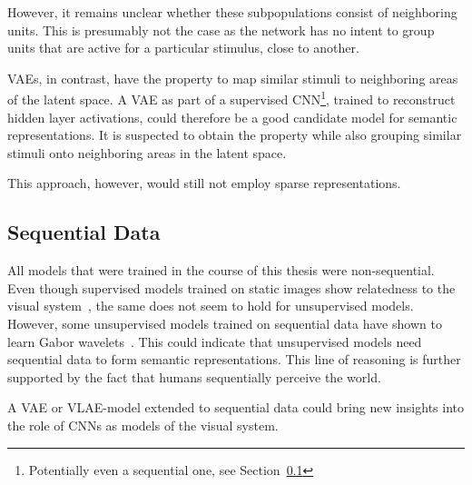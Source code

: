 However, it remains unclear whether these subpopulations consist of neighboring units.
This is presumably not the case as the network has no intent to group units that are active for a particular stimulus, close to another.

\acfp{VAE}, in contrast, have the property to map similar stimuli to neighboring areas of the latent space.
A \ac{VAE} as part of a supervised \ac{CNN}\footnote{Potentially even a sequential one, see Section~\ref{subsec:sequential-data}}, trained to reconstruct hidden layer activations, could therefore be a good candidate model for semantic representations.
It is suspected to obtain the  property while also grouping similar stimuli onto neighboring areas in the latent space.

This approach, however, would still not employ sparse representations.

\subsection{Sequential Data}\label{subsec:sequential-data}

All models that were trained in the course of this thesis were non-sequential.
Even though supervised models trained on static images show relatedness to the visual system~\citep{khaligh2014deep,cadieu2014deep,krizhevsky2012imagenet}, the same does not seem to hold for unsupervised models.
However, some unsupervised models trained on sequential data have shown to learn Gabor wavelets~\citep{berkes2005slow,palm2012prediction}.
This could indicate that unsupervised models need sequential data to form semantic representations.
This line of reasoning is further supported by the fact that humans sequentially perceive the world.

A \ac{VAE} or \ac{VLAE}-model extended to sequential data could bring new insights into the role of \acp{CNN} as models of the visual system.